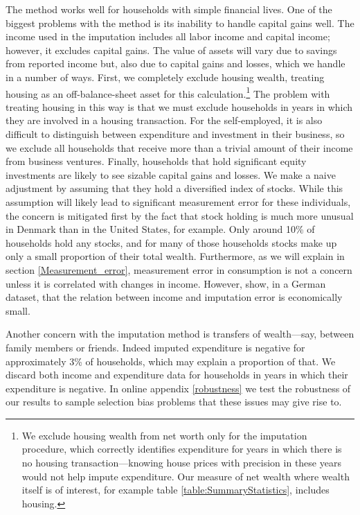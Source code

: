 \documentclass[titlepage]{\econtex}\newcommand{\texname}{ConsumptionHeterogeneity}
\begin{document}
	The method works well for households with simple financial lives. One of the biggest problems with the method is its inability to handle capital gains well. The income used in the imputation includes all labor income and capital income; however, it excludes capital gains. The value of assets will vary due to savings from reported income but, also due to capital gains and losses, which we handle in a number of ways. First, we completely exclude housing wealth, treating housing as an off-balance-sheet asset for this calculation.\footnote{We exclude housing wealth from net worth only for the imputation procedure, which correctly identifies expenditure for years in which there is no housing transaction---knowing house prices with precision in these years would not help impute expenditure. Our measure of net wealth where wealth itself is of interest, for example table \ref{table:SummaryStatistics}, includes housing.} The problem with treating housing in this way is that we must exclude households in years in which they are involved in a housing transaction. For the self-employed, it is also difficult to distinguish between expenditure and investment in their business, so we exclude all households that receive more than a trivial amount of their income from business ventures. Finally, households that hold significant equity investments are likely to see sizable capital gains and losses. We make a naive adjustment by assuming that they hold a diversified index of stocks. While this assumption will likely lead to significant measurement error for these individuals, the concern is mitigated first by the fact that stock holding is much more unusual in Denmark than in the United States, for example. Only around 10\% of households hold any stocks, and for many of those households stocks make up only a small proportion of their total wealth. Furthermore, as we will explain in section \ref{Measurement_error}, measurement error in consumption is not a concern unless it is correlated with changes in income. However, \cite{baker_measurement_2018} show, in a German dataset, that the relation between income and imputation error is economically small. 
	
	Another concern with the imputation method is transfers of wealth---say, between family members or friends. Indeed imputed expenditure is negative for approximately 3\% of households, which may explain a proportion of that. We discard both income and expenditure data for households in years in which their expenditure is negative. In online appendix \ref{robustness} we test the robustness of our results to sample selection bias problems that these issues may give rise to.
	
\end{document}

